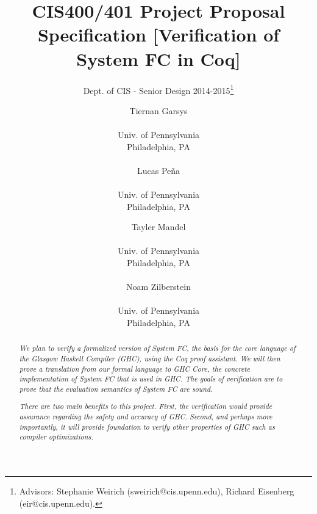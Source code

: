 \documentclass{sig-alternate}
\begin{document}
 

\title{CIS400/401 Project Proposal Specification [Verification of System FC in Coq]}
\subtitle{Dept. of CIS - Senior Design 2014-2015\thanks{Advisors: Stephanie Weirich (sweirich@cis.upenn.edu), Richard Eisenberg (eir@cis.upenn.edu).}}
\author{
  Tiernan Garsys \\  \\ Univ. of Pennsylvania \\ Philadelphia, PA\\\\
  Lucas Pe\~{n}a \\  \\ Univ. of Pennsylvania \\ Philadelphia, PA
  \and
  Tayler Mandel \\  \\ Univ. of Pennsylvania \\ Philadelphia, PA\\\\
  Noam Zilberstein \\  \\ Univ. of Pennsylvania \\ Philadelphia, PA
}
\date{}
\maketitle

\begin{abstract}
  \textit{
We plan to verify a formalized version of System FC, the basis for the core language of the Glasgow Haskell Compiler (GHC), using the Coq proof assistant. We will then prove a translation from our formal language to GHC Core, the concrete implementation of System FC that is used in GHC. The goals of verification are to prove that the evaluation semantics of System FC are sound.
  }

  \textit{
There are two main benefits to this project. First, the verification would provide assurance regarding the safety and accuracy of GHC. Second, and perhaps more importantly, it will provide foundation to verify other properties of GHC such as compiler optimizations.
 }
\end{abstract}
\end{document}

